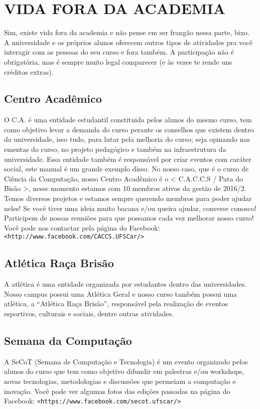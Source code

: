 \section{VIDA FORA DA ACADEMIA}
Sim, existe vida fora da academia e não pense em ser frangão nessa parte, bixo. A universidade e os próprios alunos oferecem outros tipos de atividades pra você interagir com as pessoas do seu curso e fora também. A participação não é obrigatória, mas é sempre muito legal comparecer (e às vezes te rende uns créditos extras).

\subsection{Centro Acadêmico}
O C.A. é uma entidade estudantil constituida pelos alunos do mesmo curso, tem como objetivo levar a demanda do curso perante os conselhos que existem dentro da universidade, isso tudo, para lutar pela melhoria do curso; seja opinando nas ementas do curso, no projeto pedagógico e também na infraestrutura da universidade. Essa entidade também é responsável por criar eventos com caráter social, este manual é um grande exemplo disso. No nosso caso, que é o curso de Ciência da Computação, nosso Centro Acadêmico é o < C.A.C.C.S / Pata do Bisão >, nesse momento estamos com 10 membros ativos da gestão de 2016/2. Temos diversos projetos e estamos sempre querendo membros para poder ajudar neles! Se você tiver uma ideia muito bacana e/ou queira ajudar, converse conosco! Participem de nossas reuniões para que possamos cada vez melhorar nosso curso! Você pode nos contactar pela página do Facebook: \newline \texttt{<http://www.facebook.com/CACCS.UFSCar/>}

\subsection{Atlética Raça Brisão}
A atlética é uma entidade organizada por estudantes dentro das universidades. Nosso campus possui uma Atlética Geral e nosso curso também possui uma atlética, a “Atlética Raça Brisão”, responsável pela realização de eventos esportivos, culturais e sociais, dentre outras atividades.

\subsection{Semana da Computação}
A SeCoT (Semana de Computação e Tecnologia) é um evento organizado pelos alunos do curso que tem como objetivo difundir em palestras e/ou workshops, novas tecnologias, metodologias e discussões que permeiam a computação e inovação. Você pode ver algumas fotos das edições passadas na página do Facebook: \newline \texttt{<https://www.facebook.com/secot.ufscar/>}


